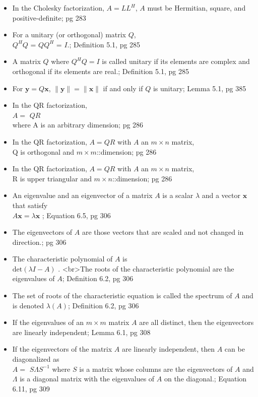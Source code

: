\documentclass{article}
\begin{document}
\begin{multicols}{2}
\begin{itemize}
\item In the Cholesky factorization, $A = LL^H$, $A$ must be Hermitian, square, and positive-definite; pg 283
\item For a unitary (or orthogonal) matrix $Q$, \\
$Q^H Q$ = $Q Q^H$ = $I$.; Definition 5.1, pg 285
\item A matrix $Q$ where $Q^H Q = I$ is called unitary if its elements are complex and orthogonal if its elements are real.; Definition 5.1, pg 285
\item For $\mathbf{y} = Q \mathbf{x} $, $ \|\mathbf{y} \| = \|\mathbf{x}\| $ if and only if $Q$ is unitary; Lemma 5.1, pg 385
\item In the QR factorization, \\
$A = $ $QR$ \\
where A is an arbitrary dimension; pg 286
\item In the QR factorization, $A = QR$ with $A$ an $m \times n$ matrix,\\
Q is orthogonal and $m \times m$::dimension; pg 286
\item In the QR factorization, $A = QR$ with $A$ an $m \times n$ matrix,\\
R is upper triangular and $m \times n$::dimension; pg 286
\item An eigenvalue and an eigenvector of a matrix $A$ is a scalar $\lambda$ and a vector $\mathbf{x}$ that satisfy \\
$A \mathbf{x} = \lambda \mathbf{x} $ ; Equation 6.5, pg 306
\item The eigenvectors of $A$ are those vectors that are scaled and not changed in direction.; pg 306
\item The characteristic polynomial of $A$ is \\
$\mathrm{det}(\lambda I - A) $ . <br>The roots of the characteristic polynomial are the eigenvalues of $A$; Definition 6.2, pg 306
\item The set of roots of the characteristic equation is called the spectrum of $A$ and is denoted $\lambda(A)$; Definition 6.2, pg 306
\item If the eigenvalues of an $m \times m$ matrix $A$ are all distinct, then the eigenvectors are linearly independent; Lemma 6.1, pg 308
\item If the eigenvectors of the matrix $A$ are linearly independent, then $A$ can be diagonalized as \\
$A = $ $S \Lambda S^{-1} $  where $S$ is a matrix whose columns are the eigenvectors of $A$ and $\Lambda$ is a diagonal matrix with the eigenvalues of $A$ on the diagonal.; Equation 6.11, pg 309

\end{itemize}
\end{multicols}
\end{document}
